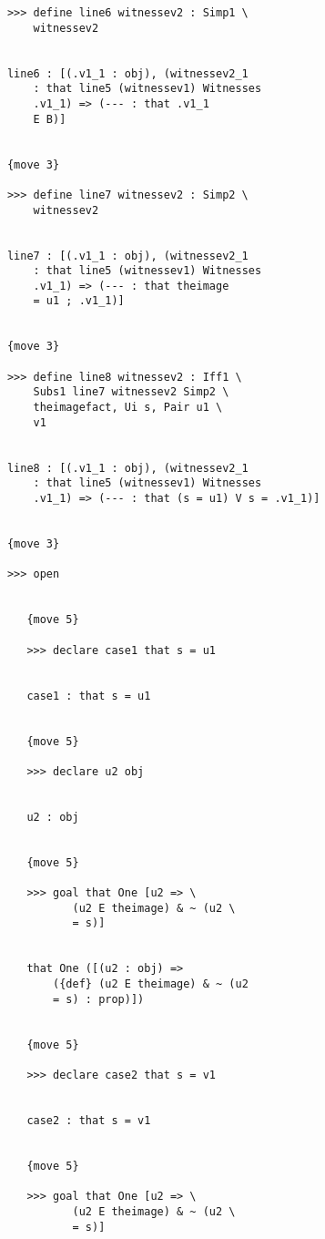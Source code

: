 \documentclass[12pt]{article}
\begin{document}
\begin{verbatim}
            >>> define line6 witnessev2 : Simp1 \
                witnessev2


            line6 : [(.v1_1 : obj), (witnessev2_1 
                : that line5 (witnessev1) Witnesses 
                .v1_1) => (--- : that .v1_1 
                E B)]


            {move 3}

            >>> define line7 witnessev2 : Simp2 \
                witnessev2


            line7 : [(.v1_1 : obj), (witnessev2_1 
                : that line5 (witnessev1) Witnesses 
                .v1_1) => (--- : that theimage 
                = u1 ; .v1_1)]


            {move 3}

            >>> define line8 witnessev2 : Iff1 \
                Subs1 line7 witnessev2 Simp2 \
                theimagefact, Ui s, Pair u1 \
                v1


            line8 : [(.v1_1 : obj), (witnessev2_1 
                : that line5 (witnessev1) Witnesses 
                .v1_1) => (--- : that (s = u1) V s = .v1_1)]


            {move 3}

            >>> open


               {move 5}

               >>> declare case1 that s = u1


               case1 : that s = u1


               {move 5}

               >>> declare u2 obj


               u2 : obj


               {move 5}

               >>> goal that One [u2 => \
                      (u2 E theimage) & ~ (u2 \
                      = s)]


               that One ([(u2 : obj) => 
                   ({def} (u2 E theimage) & ~ (u2 
                   = s) : prop)])


               {move 5}

               >>> declare case2 that s = v1


               case2 : that s = v1


               {move 5}

               >>> goal that One [u2 => \
                      (u2 E theimage) & ~ (u2 \
                      = s)]



\end{verbatim}
\end{document}
